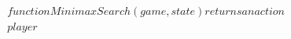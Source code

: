 \documentclass[preview]{standalone}
\begin{document}
\begin{align*}
&function MinimaxSearch(game, state) returns an action \\&player
\end{align*}
\end{document}
